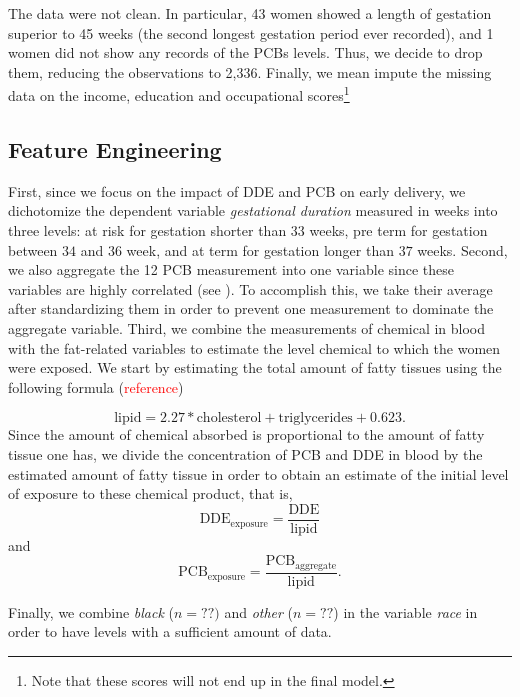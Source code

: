 \documentclass[wcp]{jmlr}%
\newcommand\todo[1]{\textcolor{red}{#1}}
\begin{document}
The data were not clean. In particular, 43 women showed a length of gestation superior to 45 weeks (the second longest gestation period ever recorded), and 1 women did not show any records of the PCBs levels. Thus, we decide to drop them, reducing the observations to 2,336. Finally, we mean impute the missing data on the income, education and occupational scores\footnote{Note that these scores will not end up in the final model.}

\subsection{Feature Engineering}
First, since we focus on the impact of DDE and PCB on early delivery, we dichotomize the dependent variable \textit{gestational duration} measured in weeks into three levels: at risk for gestation shorter than $33$ weeks, pre term for gestation between $34$ and $36$ week, and at term for gestation longer than $37$ weeks. 
Second, we also aggregate the 12 PCB measurement into one variable since these variables are highly correlated (see ). To accomplish this, we take their average after standardizing them in order to prevent one measurement to dominate the aggregate variable. 
Third, we combine the measurements of chemical in blood with the fat-related variables to estimate the level chemical to which the women were exposed. We start by estimating the total amount of fatty tissues using the following formula (\todo{reference})

\begin{equation}
\label{eq:fat}
\text{lipid} = 2.27 * \text{cholesterol} + \text{triglycerides} + 0.623.
\end{equation}
Since the amount of chemical absorbed is proportional to the amount of fatty tissue one has, we divide the concentration of PCB and DDE in blood by the estimated amount of fatty tissue in order to obtain an estimate of the initial level of exposure to these chemical product, that is,
\begin{equation}
\label{eq:exp_dde}
\text{DDE}_{\text{exposure}} = \dfrac{\text{DDE}}{\text{lipid}}
\end{equation}
and 
\begin{equation}
\label{eq:exp_pcb}
\text{PCB}_{\text{exposure}} = \dfrac{\text{PCB}_\text{aggregate}}{\text{lipid}}.
\end{equation}

Finally, we combine \textit{black} ($n=??)$ and \textit{other} ($n=??$) in the variable \textit{race} in order to have levels with a sufficient amount of data.
\end{document}
